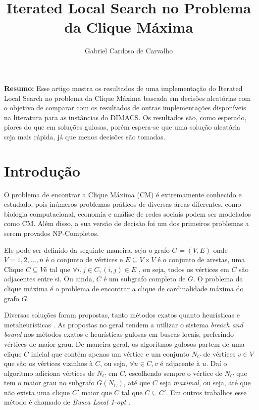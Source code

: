\documentclass{article}
\title{Iterated Local Search no Problema da Clique Máxima}
\author{Gabriel Cardoso de Carvalho}
\date{}
\begin{document}
\maketitle

\textbf{Resumo:} Esse artigo mostra os resultados de uma implementação do Iterated Local Search no problema da Clique Máxima baseada em decisões aleatórias com o objetivo de comparar com os resultados de outras implementações disponíveis na literatura para as instâncias do DIMACS. Os resultados são, como esperado, piores do que em soluções gulosas, porém espera-se que uma solução aleatória seja mais rápida, já que menos decisões são tomadas.

\section{Introdução}

O problema de encontrar a Clique Máxima (CM) é extremamente conhecido e estudado, pois inúmeros problemas práticos de diversas áreas diferentes, como biologia computacional, economia e análise de redes sociais podem ser modelados como CM. 
Além disso, a sua versão de decisão foi um dos primeiros problemas a serem provados NP-Completos.\par 

Ele pode ser definido da seguinte maneira, seja o grafo $G=(V,E)$ onde $V = 1,2, ... , n$ é o conjunto de vértices e $E \subseteq V \times V$ é o conjunto de arestas, uma Clique $C \subseteq V $é tal que $\forall i,j \in C, (i,j) \in E$ 
, ou seja, todos os vértices em $C$ são adjacentes entre si. Ou ainda, $C$ é um subgrafo completo de $G$. O problema da clique máxima é o problema de encontrar a clique de cardinalidade máxima do grafo $G$.\par

Diversas soluções foram propostas, tanto métodos exatos quanto heurísticas e metaheurísticas \cite{review,pardaloshand,DIMACS2}. As propostas no geral tendem a utilizar o sistema \textit{breach and bound} nos métodos exatos e heurísticas gulosas em buscas locais, preferindo vértices de maior grau. De maneira geral, os algoritmos gulosos partem de uma clique $C$ inicial que contém apenas um vértice e um conjunto $N_C$ de vértices $v \in V$ que são os vértices vizinhos à $C$, ou seja, $\forall u \in C, v$ é adjacente à $u$. Daí o algoritmo adiciona vértices de  $N_C$ em $C$, escolhendo sempre o vértice de $N_C$ que tem o maior grau no subgrafo $G(N_C)$, até que $C$ seja \textit{maximal}, ou seja, até que não exista uma clique $C'$ maior que $C$ tal que $C \subseteq C'$. Em outros trabalhos esse método é chamado de \textit{Busca Local 1-opt } \cite{KLS}.\par
\end{document}
